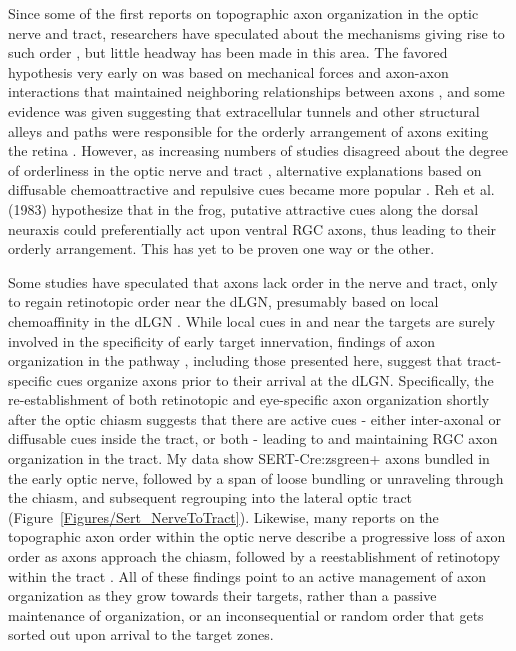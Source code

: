 Since some of the first reports on topographic axon organization in the optic nerve and tract, researchers have speculated about the mechanisms giving rise to such order \cite[e.g.][]{cook1977multiple,reh1983organization}, but little headway has been made in this area.
The favored hypothesis very early on was based on mechanical forces and axon-axon interactions that maintained neighboring relationships between axons \cite{cook1977multiple}, and some evidence was given suggesting that extracellular tunnels and other structural alleys and paths were responsible for the orderly arrangement of axons exiting the retina \cite{silver1980mechanism}.
However, as increasing numbers of studies disagreed about the degree of orderliness in the optic nerve and tract \cite{martin1983role}, alternative explanations based on diffusable chemoattractive and repulsive cues became more popular \cite{reh1983organization}.
Reh et al. (1983) hypothesize that in the frog, putative attractive cues along the dorsal neuraxis could preferentially act upon ventral RGC axons, thus leading to their orderly arrangement.
This has yet to be proven one way or the other.

Some studies have speculated that axons lack order in the nerve and tract, only to regain retinotopic order near the dLGN, presumably based on local chemoaffinity in the dLGN \cite{horton1979non}.
While local cues in and near the targets are surely involved in the specificity of early target innervation, findings of axon organization in the pathway \cite{martin1983role,chan1999changes,chan1994changes,plas2005pretarget,reese1993reestablishment}, including those presented here, suggest that tract-specific cues organize axons prior to their arrival at the dLGN.
Specifically, the re-establishment of both retinotopic and eye-specific axon organization shortly after the optic chiasm suggests that there are active cues - either inter-axonal or diffusable cues inside the tract, or both - leading to and maintaining RGC axon organization in the tract.
My data show SERT-Cre:zsgreen+ axons bundled in the early optic nerve, followed by a span of loose bundling or unraveling through the chiasm, and subsequent regrouping into the lateral optic tract (Figure~\ref{Figures/Sert_NerveToTract}).
Likewise, many reports on the topographic axon order within the optic nerve describe a progressive loss of axon order as axons approach the chiasm, followed by a reestablishment of retinotopy within the tract \cite{chan1999changes,plas2005pretarget,chan1994changes,simon1991relationship,reese1993reestablishment,horton1979non,naito1986course,naito1994retinogeniculate,colello1998changing,montgomery1998organization,ehrlich1984course}. 
All of these findings point to an active management of axon organization as they grow towards their targets, rather than a passive maintenance of organization, or an inconsequential or random order that gets sorted out upon arrival to the target zones.

